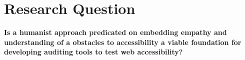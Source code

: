 \section{Research Question} %
\label{sec:research_question}

\textbf{Is a humanist approach predicated on embedding empathy and understanding of a obstacles to accessibility a viable foundation for developing auditing tools to test web accessibility?}

